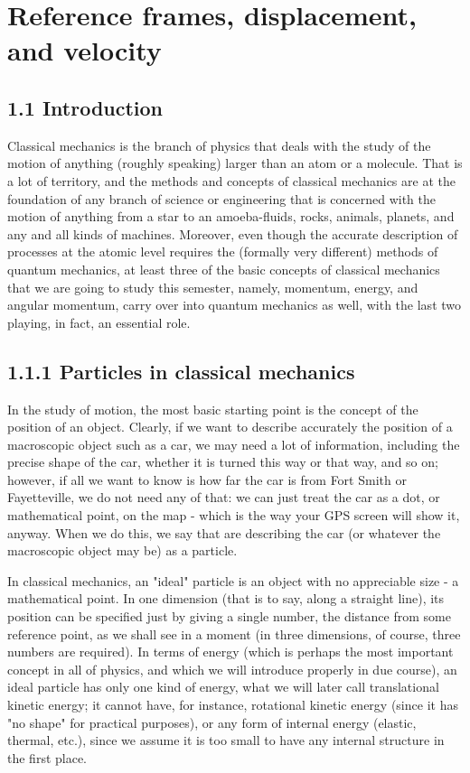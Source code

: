 \documentclass[10pt]{article}
\begin{document}
\section*{Reference frames, displacement, and velocity}
\subsection*{1.1 Introduction}
Classical mechanics is the branch of physics that deals with the study of the motion of anything (roughly speaking) larger than an atom or a molecule. That is a lot of territory, and the methods and concepts of classical mechanics are at the foundation of any branch of science or engineering that is concerned with the motion of anything from a star to an amoeba-fluids, rocks, animals, planets, and any and all kinds of machines. Moreover, even though the accurate description of processes at the atomic level requires the (formally very different) methods of quantum mechanics, at least three of the basic concepts of classical mechanics that we are going to study this semester, namely, momentum, energy, and angular momentum, carry over into quantum mechanics as well, with the last two playing, in fact, an essential role.

\subsection*{1.1.1 Particles in classical mechanics}
In the study of motion, the most basic starting point is the concept of the position of an object. Clearly, if we want to describe accurately the position of a macroscopic object such as a car, we may need a lot of information, including the precise shape of the car, whether it is turned this way or that way, and so on; however, if all we want to know is how far the car is from Fort Smith or Fayetteville, we do not need any of that: we can just treat the car as a dot, or mathematical point, on the map - which is the way your GPS screen will show it, anyway. When we do this, we say that are describing the car (or whatever the macroscopic object may be) as a particle.

In classical mechanics, an "ideal" particle is an object with no appreciable size - a mathematical point. In one dimension (that is to say, along a straight line), its position can be specified just by giving a single number, the distance from some reference point, as we shall see in a moment (in three dimensions, of course, three numbers are required). In terms of energy (which is perhaps the most important concept in all of physics, and which we will introduce properly in due course), an ideal particle has only one kind of energy, what we will later call translational kinetic energy; it cannot have, for instance, rotational kinetic energy (since it has "no shape" for practical purposes), or any form of internal energy (elastic, thermal, etc.), since we assume it is too small to have any internal structure in the first place.
\end{document}

